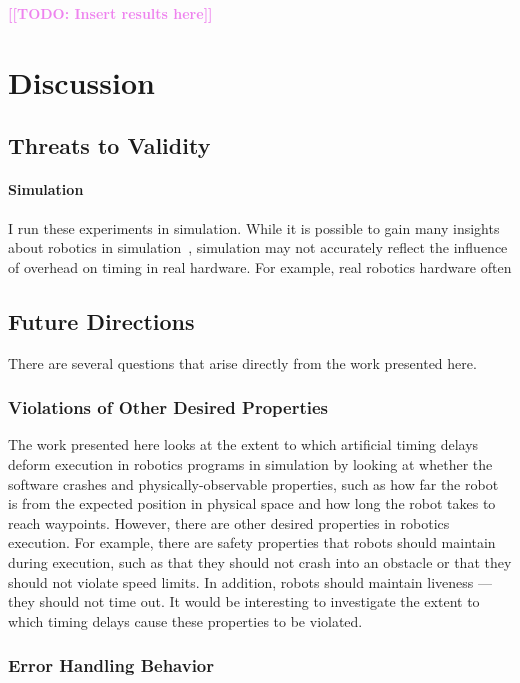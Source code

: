 \documentclass[conference]{IEEEtran}
\newcommand{\todo}[1]{\textcolor{violet}{{\bfseries [[TODO: #1]]}}}
\begin{document}
\todo{Insert results here}

\section{Discussion}

\subsection{Threats to Validity}

\paragraph{Simulation}
I run these experiments in simulation.
While it is possible to gain many insights about robotics in simulation~\cite{TimperleyArdu2018, etc},
simulation may not accurately reflect the influence of overhead on timing
in real hardware.
For example, real robotics hardware often

\subsection{Future Directions}

There are several questions that arise directly from the work presented here.

\subsubsection{Violations of Other Desired Properties}

The work presented here looks at the extent to which artificial timing delays deform execution
in robotics programs in simulation by looking at whether the software crashes
and physically-observable properties, such as how far the robot is from the expected
position in physical space and how long the robot takes to reach waypoints.
However, there are other desired properties in robotics execution.
For example, there are safety properties that robots should maintain during
execution, such as that they should not crash into an obstacle or that they
should not violate speed limits.
In addition, robots should maintain liveness --- they should not time out.
It would be interesting to investigate the extent to which timing delays cause these properties to be violated.

\subsubsection{Error Handling Behavior}
\end{document}
